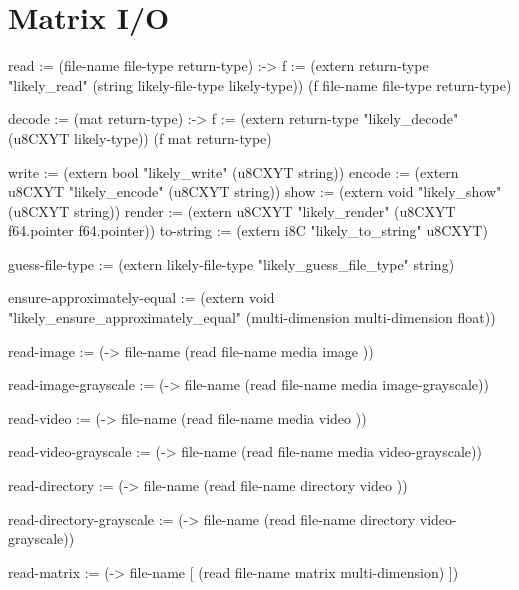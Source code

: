 \documentclass[twoside=false, numbers=noenddot]{scrbook}
\newenvironment{likely}
{ \verbatim }
{ \endverbatim }
\begin{document}
\section{Matrix I/O}
\begin{likely}
read :=
  (file-name file-type return-type) :->
  {
    f := (extern return-type
                 "likely_read"
                 (string likely-file-type likely-type))
    (f file-name file-type return-type)
  }

decode :=
  (mat return-type) :->
  {
    f := (extern return-type
                 "likely_decode"
                 (u8CXYT likely-type))
    (f mat return-type)
  }

write  := (extern bool   "likely_write"  (u8CXYT string))
encode := (extern u8CXYT "likely_encode" (u8CXYT string))
show   := (extern void   "likely_show"   (u8CXYT string))
render := (extern u8CXYT "likely_render" (u8CXYT f64.pointer f64.pointer))
to-string := (extern i8C "likely_to_string" u8CXYT)

guess-file-type :=
  (extern likely-file-type "likely_guess_file_type" string)

ensure-approximately-equal :=
  (extern void "likely_ensure_approximately_equal" (multi-dimension multi-dimension float))
\end{likely}

\begin{likely}
read-image :=
  (-> file-name (read file-name media     image          ))

read-image-grayscale :=
  (-> file-name (read file-name media     image-grayscale))

read-video :=
  (-> file-name (read file-name media     video          ))

read-video-grayscale :=
  (-> file-name (read file-name media     video-grayscale))

read-directory :=
  (-> file-name (read file-name directory video          ))

read-directory-grayscale :=
  (-> file-name (read file-name directory video-grayscale))

read-matrix :=
  (-> file-name [ (read file-name matrix multi-dimension) ])
\end{likely}
\end{document}
